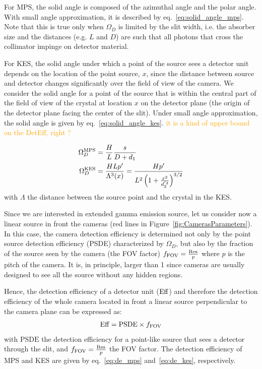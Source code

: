 \documentclass[a4paper,english,12pt]{article}
\newcommand{\ds}[2][orange]{\textcolor{#1}{#2}}
\begin{document}
For MPS, the solid angle is composed of the azimuthal angle and the polar angle. With small angle approximation, it is described by
eq.~\ref{eq:solid_angle_mps}. Note that this is true only when $\Omega_D$ is
limited by the slit width, i.e. the absorber size and the distances (e.g. $L$ and $D$) are such that
all photons that cross the collimator impinge on detector material. 

For KES, the solid angle under which a point of the source sees a detector unit depends on the location of the point source, $x$, since the distance between source and detector changes significantly over the field of view of the camera. We
consider the solid angle for a point of the source that is within the central
part of the field of view of the crystal at location $x$ on the detector plane
(the origin of the detector plane facing the center of the slit). Under small
angle approximation, the solid angle is given by eq.~\ref{eq:solid_angle_kes}. \ds{it is a kind of upper bound on the DetEff, right ? }

\begin{align}  
  \Omega_D^{\textrm{MPS}} & = \frac{H}{L} \frac{s}{D+d_1} \label{eq:solid_angle_mps} \\
	\Omega_D^{\textrm{KES}} & = \frac{H L p'}{\Lambda^3(x)} =  \frac{H p'}{L^2 \left( 1+\frac{x^2}{d_2^{'2}} \right)^{3/2}} \label{eq:solid_angle_kes} 
\end{align}
with $\Lambda$ the distance between the source point and the crystal in the KES.


Since we are interested in extended gamma emission source, let us consider now a linear source in front the cameras (red lines in Figure~\ref{fig:CamerasParameters}). In this case, the camera detection efficiency is determined not only by the point source detection efficiency (PSDE) characterized by $\Omega_D$, but also by the fraction of the source seen by the camera (the FOV factor) $f_{\textrm{FOV}} = \frac{\textrm{Res}_{}}{p}$ where $p$ is the pitch of the camera. It is, in principle, larger than 1 since cameras are usually designed to see all the source without any hidden regions.

Hence, the detection efficiency of a detector unit ($\textrm{Eff}_{}$) and therefore the detection efficiency of the whole camera located in front a linear source perpendicular to  the camera plane can be expressed as:
\begin{align} 
	\textrm{Eff}_{} = \textrm{PSDE} \times f_{\textrm{FOV}}
\end{align}
with $\textrm{PSDE}$ the detection efficiency for a point-like source that sees a detector through the slit, and $f_{\textrm{FOV}} = \frac{\textrm{Res}_{}}{p}$ the FOV factor. The detection efficiency of MPS and KES are given by eq.~\ref{eq:de_mps} and~\ref{eq:de_kes}, respectively.
\end{document}
